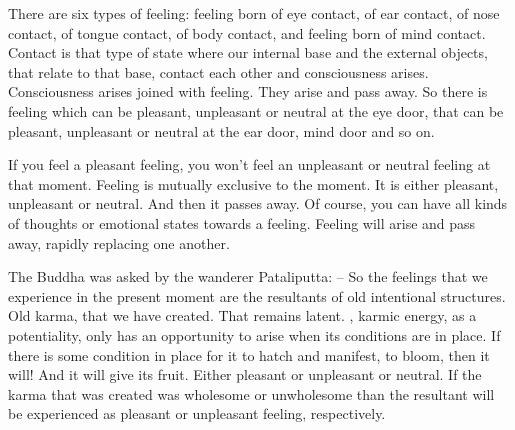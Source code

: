\documentclass[letterpaper,10pt,english]{sphinxmanual}
\begin{document}
\sphinxAtStartPar
There are six types of feeling: feeling born of eye contact, of ear contact, of nose contact, of tongue contact, of body contact, and feeling born of
mind contact. Contact is that type of state where our internal base and the
external objects, that relate to that base, contact each other and consciousness  arises.  Consciousness  arises  joined  with  feeling. They  arise  and  pass
away.
So there is feeling which can be pleasant, unpleasant or
neutral at the eye door, that can be pleasant, unpleasant or neutral at the ear
door, mind door and so on.

\sphinxAtStartPar
If you feel a pleasant feeling, you won’t feel an unpleasant or neutral
feeling at that moment. Feeling is mutually exclusive to the moment. It is
either pleasant, unpleasant or neutral. And then it passes away. Of course,
you  can  have  all  kinds  of  thoughts  or  emotional  states  towards  a  feeling.
Feeling will arise and pass away, rapidly replacing one another.

\sphinxAtStartPar
The Buddha was asked by the wanderer Pataliputta:
–
So the feelings that we experience in the present moment
are the resultants of old intentional structures. Old karma, that we have created. That remains latent.
, karmic energy, as a potentiality, only
has an opportunity to arise when its conditions are in place. If there is some
condition in place for it to hatch and manifest, to bloom, then it will! And
it will give its fruit. Either pleasant or unpleasant or neutral. If the karma
that was created was wholesome or unwholesome than the resultant will be
experienced as pleasant or unpleasant feeling, respectively.
\end{document}
